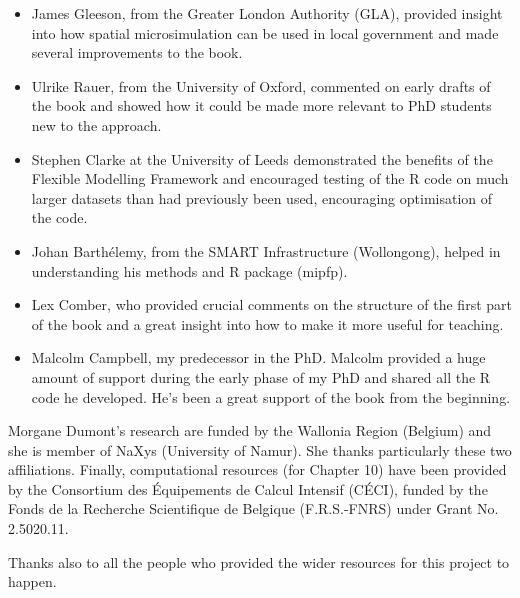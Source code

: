  \begin{itemize}
   \item James Gleeson, from the Greater London Authority (GLA), provided insight
   into how spatial microsimulation can be used in local government and made several
   improvements to the book.
   \item Ulrike Rauer, from the University of Oxford, commented on
   early drafts of the book and showed how it could be made more relevant to PhD
   students new to the approach.
   \item Stephen Clarke at the University of Leeds demonstrated the benefits of
   the Flexible Modelling Framework and encouraged testing of the R code on much
   larger datasets than had previously been used, encouraging optimisation of the code.
   \item Johan Barthélemy, from the SMART Infrastructure (Wollongong), helped in
   understanding his methods and R package (mipfp).
   \item Lex Comber, who provided crucial comments on the structure of the first part of the book and a great insight into how to make it more useful for teaching.
   \item Malcolm Campbell, my predecessor in the PhD. Malcolm provided a huge amount of support during the early phase of my PhD and shared
all the R code he developed. He's been a great support of the book from the beginning.
 \end{itemize}
 
 Morgane Dumont's research are funded by the Wallonia Region (Belgium) and she 
 is member of NaXys (University of Namur). She thanks particularly these two affiliations.
 Finally, computational resources (for Chapter 10) have been provided by the Consortium des Équipements de 
 Calcul Intensif (CÉCI), funded by the Fonds de la Recherche Scientifique de Belgique 
 (F.R.S.-FNRS) under Grant No. 2.5020.11.
 
 Thanks also to all the people
 who provided the wider resources for this project to happen.


